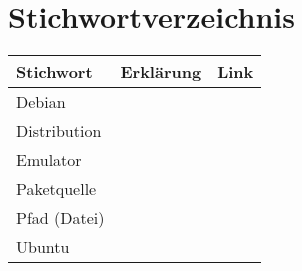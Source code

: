 \pagebreak
\section{Stichwortverzeichnis}

\begin{tabularx}{1\textwidth}{lXl}
	\textbf{Stichwort} & \textbf{Erklärung} & \textbf{Link} \\
	\hline
	Debian &&\\
	Distribution &&\\
	Emulator &&\\
	Paketquelle &&\\
	Pfad (Datei) &&\\
	Ubuntu &&\\
\end{tabularx}